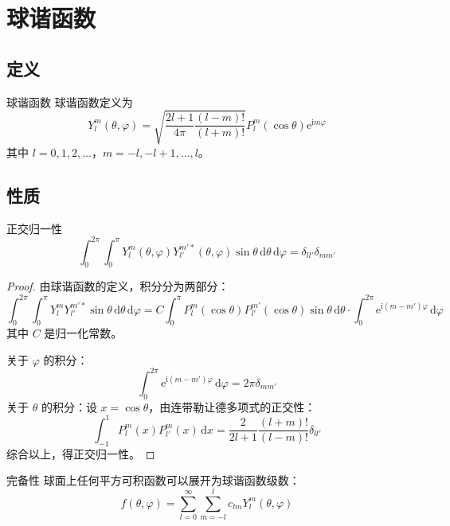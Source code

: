 \section{球谐函数}

\subsection{定义}

\begin{dingliyi}{球谐函数}{}
球谐函数定义为
\begin{equation}
    \boxed{Y_l^m(\theta, \varphi) = \sqrt{\frac{2l+1}{4\pi}\frac{(l-m)!}{(l+m)!}}P_l^m(\cos\theta)\mathrm{e}^{\mathrm{i}m\varphi}}
\end{equation}
其中 $l = 0, 1, 2, \ldots$，$m = -l, -l+1, \ldots, l$。
\end{dingliyi}

\subsection{性质}

\begin{dingli}{正交归一性}{}
\begin{equation}
    \int_0^{2\pi}\int_0^{\pi} Y_l^m(\theta, \varphi)Y_{l'}^{m'*}(\theta, \varphi)\sin\theta\,\mathrm{d}\theta\,\mathrm{d}\varphi = \delta_{ll'}\delta_{mm'}
\end{equation}
\end{dingli}

\begin{proof}
由球谐函数的定义，积分分为两部分：
\begin{equation}
    \int_0^{2\pi}\int_0^{\pi} Y_l^m Y_{l'}^{m'*} \sin\theta\,\mathrm{d}\theta\,\mathrm{d}\varphi = C \int_0^{\pi} P_l^m(\cos\theta)P_{l'}^{m'}(\cos\theta)\sin\theta\,\mathrm{d}\theta \cdot \int_0^{2\pi} \mathrm{e}^{\mathrm{i}(m-m')\varphi}\,\mathrm{d}\varphi
\end{equation}
其中 $C$ 是归一化常数。

关于 $\varphi$ 的积分：
\begin{equation}
    \int_0^{2\pi} \mathrm{e}^{\mathrm{i}(m-m')\varphi}\,\mathrm{d}\varphi = 2\pi\delta_{mm'}
\end{equation}
关于 $\theta$ 的积分：设 $x = \cos\theta$，由连带勒让德多项式的正交性：
\begin{equation}
    \int_{-1}^{1} P_l^m(x)P_{l'}^m(x)\,\mathrm{d}x = \frac{2}{2l+1}\frac{(l+m)!}{(l-m)!}\delta_{ll'}
\end{equation}
综合以上，得正交归一性。
\end{proof}
\begin{dingli}{完备性}{}
球面上任何平方可积函数可以展开为球谐函数级数：
\begin{equation}
    f(\theta, \varphi) = \sum_{l=0}^{\infty}\sum_{m=-l}^{l} c_{lm}Y_l^m(\theta, \varphi)
\end{equation}
\end{dingli}


